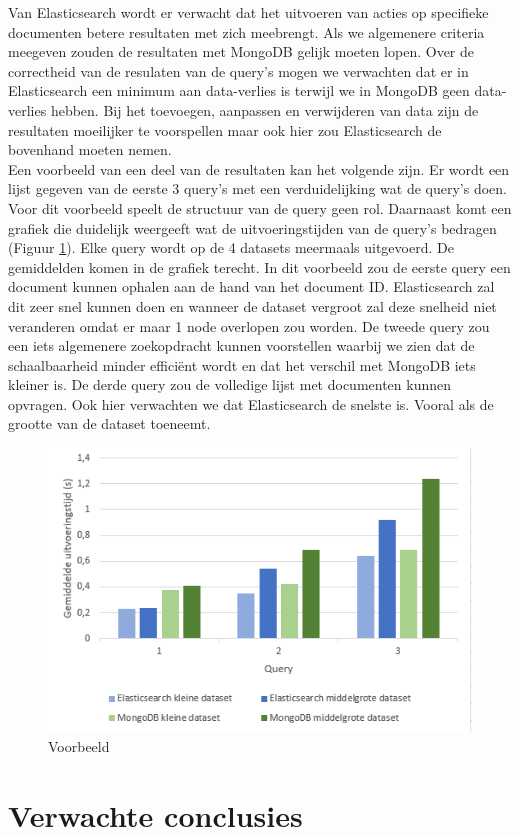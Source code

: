 \documentclass[fleqn,10pt]{voorstel}
\begin{document}
	Van Elasticsearch wordt er verwacht dat het uitvoeren van acties op specifieke documenten betere resultaten met zich meebrengt. Als we algemenere criteria meegeven zouden de resultaten met MongoDB gelijk moeten lopen. Over de correctheid van de resulaten van de query's mogen we verwachten dat er in Elasticsearch een minimum aan data-verlies is terwijl we in MongoDB geen data-verlies hebben. Bij het toevoegen, aanpassen en verwijderen van data zijn de resultaten moeilijker te voorspellen maar ook hier zou Elasticsearch de bovenhand moeten nemen.
	\\
	Een voorbeeld van een deel van de resultaten kan het volgende zijn. Er wordt een lijst gegeven van de eerste 3 query's met een verduidelijking wat de query's doen. Voor dit voorbeeld speelt de structuur van de query geen rol. Daarnaast komt een grafiek die duidelijk weergeeft wat de uitvoeringstijden van de query's bedragen (Figuur \ref{fig:example}). Elke query wordt op de 4 datasets meermaals uitgevoerd. De gemiddelden komen in de grafiek terecht. In dit voorbeeld zou de eerste query een document kunnen ophalen aan de hand van het document ID. Elasticsearch zal dit zeer snel kunnen doen en wanneer de dataset vergroot zal deze snelheid niet veranderen omdat er maar 1 node overlopen zou worden. De tweede query zou een iets algemenere zoekopdracht kunnen voorstellen waarbij we zien dat de schaalbaarheid minder efficiënt wordt en dat het verschil met MongoDB iets kleiner is. De derde query zou de volledige lijst met documenten kunnen opvragen. Ook hier verwachten we dat Elasticsearch de snelste is. Vooral als de grootte van de dataset toeneemt.
	\begin{figure}
		\includegraphics[width=.5\textwidth,center]{graph}
		\caption{Voorbeeld}
		\label{fig:example}
	\end{figure}
	
	
	\section{Verwachte conclusies}
	\label{sec:verwachte_conclusies}
	
\end{document}
